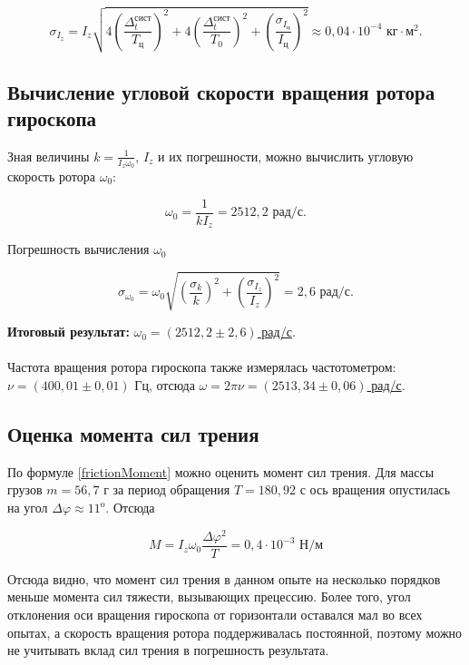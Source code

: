 \documentclass[a4paper,12pt]{article} %
\begin{document}
\begin{equation}
    \sigma_{I_z} = I_z \sqrt{4(\frac{\Delta_t^\text{сист}}{T_\text{ц}})^2 + 4(\frac{\Delta_t^\text{сист}}{T_\text{0}})^2 + (\frac{\sigma_{I_\text{ц}}}{I_\text{ц}})^2} \approx 0,04 \cdot 10^{-4}  \text{ кг} \cdot \text{м}^2.
\end{equation}

\subsection{Вычисление угловой скорости вращения ротора гироскопа}

Зная величины $ k = \frac{1}{I_z\omega_0} $, $ I_z $ и их погрешности, можно вычислить угловую скорость ротора $ \omega_0 $:

\begin{equation}
    \omega_0 = \frac{1}{kI_z} = 2512,2 \text{ рад/с}. 
\end{equation}

Погрешность вычисления $ \omega_0 $

\begin{equation}
    \sigma_{\omega_0} = \omega_0 \sqrt{(\frac{\sigma_k}{k})^2 + (\frac{\sigma_{I_z}}{I_z})^2} = 2,6 \text{ рад/с}. 
\end{equation}

\textbf{Итоговый результат:} \underline{$ \omega_0 = (2512,2 \pm 2,6) $ рад/с}.
\\
\\
Частота вращения ротора гироскопа также измерялась частотометром: $ \nu = (400,01 \pm 0,01) $ Гц, отсюда \underline{$ \omega = 2\pi\nu = (2513,34 \pm 0,06) $ рад/с}.

\subsection{Оценка момента сил трения}

По формуле \eqref{frictionMoment} можно оценить момент сил трения. Для массы грузов $ m = 56,7 $ г за период обращения $ T = 180,92 $ с ось вращения опустилась на угол $ \Delta\varphi \approx 11^\text{o} $. Отсюда

\begin{equation}
    M = I_z \omega_0 \frac{\Delta\varphi^2}{T} = 0,4 \cdot 10^{-3} \text{ Н/м}
\end{equation}

Отсюда видно, что момент сил трения в данном опыте на несколько порядков меньше момента сил тяжести, вызывающих прецессию. Более того, угол отклонения оси вращения гироскопа от горизонтали оставался мал во всех опытах, а скорость вращения ротора поддерживалась постоянной, поэтому можно не учитывать вклад сил трения в погрешность результата.
\end{document}
